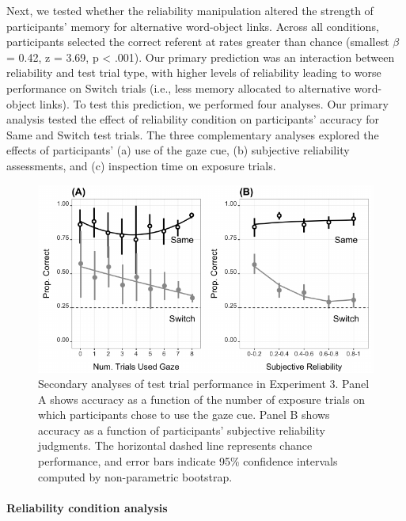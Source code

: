 \documentclass[authoryear, review]{elsarticle}
\newenvironment{CodeChunk}{}{}
\begin{document}
Next, we tested whether the reliability manipulation altered the
strength of participants' memory for alternative word-object links.
Across all conditions, participants selected the correct referent at
rates greater than chance (smallest \(\beta\) = 0.42, z = 3.69, p
\textless{} .001). Our primary prediction was an interaction between
reliability and test trial type, with higher levels of reliability
leading to worse performance on Switch trials (i.e., less memory
allocated to alternative word-object links). To test this prediction, we
performed four analyses. Our primary analysis tested the effect of
reliability condition on participants' accuracy for Same and Switch test
trials. The three complementary analyses explored the effects of
participants' (a) use of the gaze cue, (b) subjective reliability
assessments, and (c) inspection time on exposure trials.

\begin{CodeChunk}
\begin{figure}[tb]
\includegraphics{figs/expt3-sub-plots-1} \caption[Secondary analyses of test trial performance in Experiment 3]{Secondary analyses of test trial performance in Experiment 3. Panel A shows accuracy as a function of the number of exposure trials on which participants chose to use the gaze cue. Panel B shows accuracy as a function of participants' subjective reliability judgments. The horizontal dashed line represents chance performance, and error bars indicate 95\% confidence intervals computed by non-parametric bootstrap.}\label{fig:expt3-sub-plots}
\end{figure}
\end{CodeChunk}

\paragraph{Reliability condition
analysis}\label{reliability-condition-analysis}
\end{document}
